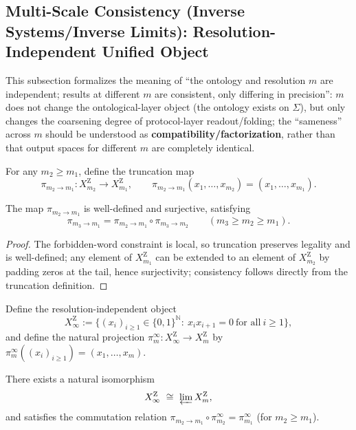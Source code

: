 \subsection{Multi-Scale Consistency (Inverse Systems/Inverse Limits): Resolution-Independent Unified Object}

This subsection formalizes the meaning of ``the ontology and resolution $m$ are independent; results at different $m$ are consistent, only differing in precision'': $m$ does not change the ontological-layer object (the ontology exists on $\Sigma$), but only changes the coarsening degree of protocol-layer readout/folding; the ``sameness'' across $m$ should be understood as \textbf{compatibility/factorization}, rather than that output spaces for different $m$ are completely identical.

\begin{definition}\label{def:static-pi}
For any $m_2\ge m_1$, define the truncation map
\[
\pi_{m_2\to m_1}:X_{m_2}^{\mathrm Z}\to X_{m_1}^{\mathrm Z},\qquad
\pi_{m_2\to m_1}(x_1,\dots,x_{m_2})=(x_1,\dots,x_{m_1}).
\]
\end{definition}

\begin{lemma}\label{lem:static-pi-basic}
The map $\pi_{m_2\to m_1}$ is well-defined and surjective, satisfying
\[
\pi_{m_3\to m_1}=\pi_{m_2\to m_1}\circ \pi_{m_3\to m_2}\qquad (m_3\ge m_2\ge m_1).
\]
\end{lemma}

\begin{proof}
The forbidden-word constraint is local, so truncation preserves legality and is well-defined; any element of $X_{m_1}^{\mathrm Z}$ can be extended to an element of $X_{m_2}^{\mathrm Z}$ by padding zeros at the tail, hence surjectivity; consistency follows directly from the truncation definition.
\end{proof}

\begin{definition}\label{def:static-XinfZ}
Define the resolution-independent object
\[
X_\infty^{\mathrm Z}:=\{(x_i)_{i\ge 1}\in\{0,1\}^{\mathbb{N}}:\ x_ix_{i+1}=0\ \text{for all}\ i\ge 1\},
\]
and define the natural projection $\pi_m^\infty:X_\infty^{\mathrm Z}\to X_m^{\mathrm Z}$ by $\pi_m^\infty((x_i)_{i\ge 1})=(x_1,\dots,x_m)$.
\end{definition}

\begin{theorem}\label{thm:static-inverse-limit}
There exists a natural isomorphism
\[
X_\infty^{\mathrm Z}\ \cong\ \varprojlim X_m^{\mathrm Z},
\]
and satisfies the commutation relation $\pi_{m_2\to m_1}\circ \pi_{m_2}^\infty=\pi_{m_1}^\infty$ (for $m_2\ge m_1$).
\end{theorem}

